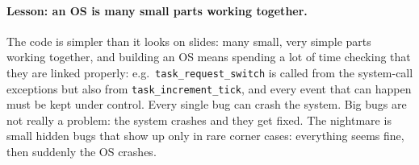 \paragraph{Lesson: an OS is many small parts working together.} The code is simpler than it looks on slides: many small, very simple parts working together, and building an OS means spending a lot of time checking that they are linked properly: e.g.\ \texttt{task\_request\_switch} is called from the system-call exceptions but also from \texttt{task\_increment\_tick}, and every event that can happen must be kept under control. Every single bug can crash the system. Big bugs are not really a problem: the system crashes and they get fixed. The nightmare is small hidden bugs that show up only in rare corner cases: everything seems fine, then suddenly the OS crashes.

